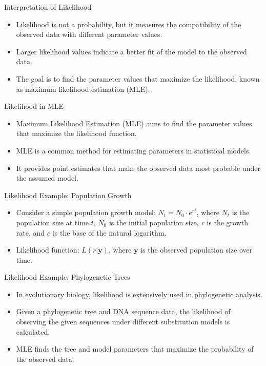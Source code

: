 \documentclass{beamer}
\begin{document}
\begin{frame}{Interpretation of Likelihood}
  \begin{itemize}
    \item Likelihood is not a probability, but it measures the compatibility of the observed data with different parameter values.
    \item Larger likelihood values indicate a better fit of the model to the observed data.
    \item The goal is to find the parameter values that maximize the likelihood, known as maximum likelihood estimation (MLE).
  \end{itemize}
\end{frame}

\begin{frame}{Likelihood in MLE}
  \begin{itemize}
    \item Maximum Likelihood Estimation (MLE) aims to find the parameter values that maximize the likelihood function.
    \item MLE is a common method for estimating parameters in statistical models.
    \item It provides point estimates that make the observed data most probable under the assumed model.
  \end{itemize}
\end{frame}

\begin{frame}{Likelihood Example: Population Growth}
  \begin{itemize}
    \item Consider a simple population growth model: \(N_t = N_0 \cdot e^{rt}\), where \(N_t\) is the population size at time \(t\), \(N_0\) is the initial population size, \(r\) is the growth rate, and \(e\) is the base of the natural logarithm.
    \item Likelihood function: \(L(r | \mathbf{y})\), where \(\mathbf{y}\) is the observed population size over time.
  \end{itemize}
\end{frame}

\begin{frame}{Likelihood Example: Phylogenetic Trees}
  \begin{itemize}
    \item In evolutionary biology, likelihood is extensively used in phylogenetic analysis.
    \item Given a phylogenetic tree and DNA sequence data, the likelihood of observing the given sequences under different substitution models is calculated.
    \item MLE finds the tree and model parameters that maximize the probability of the observed data.
  \end{itemize}
\end{frame}
\end{document}
